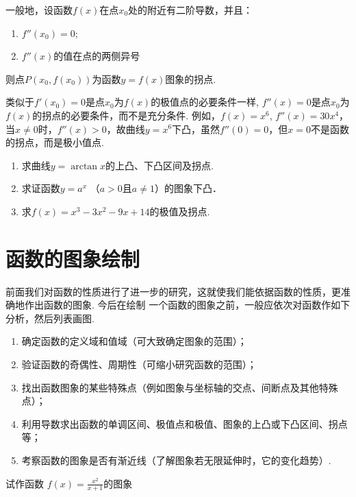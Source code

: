 一般地，设函数$f(x)$在点$x_0$处的附近有二阶导数，并且：
\begin{enumerate}[(1)]
\item $f''(x_0)=0$;
\item $f''(x)$的值在点的两侧异号
\end{enumerate}
则点$P(x_0,f(x_0))$为函数$y=f(x)$图象的拐点.

类似于$f'(x_0)=0$是点$x_0$为$f(x)$的极值点的必要条件一样, $f''(x)=0$是点$x_0$为$f(x)$的拐点的必要条件，而不是充分条件. 例如，$f(x)=x^6$, $f''(x)=30x^4$，当$x\ne 0$时，$f''(x)>0$，故曲线$y=x^6$下凸，虽然$f''(0)=0$，但$x=0$不是函数的拐点，而是极小值点.

\begin{ex}
\begin{enumerate}
    \item 求曲线$y=\arctan x$的上凸、下凸区间及拐点.
    \item 求证函数$y=a^x$ （$a>0$且$a\ne 1$）的图象下凸．
    \item 求$f(x)=x^3-3x^2-9x+14$的极值及拐点.
\end{enumerate}
\end{ex}

\section{函数的图象绘制}
前面我们对函数的性质进行了进一步的研究，这就使我们能依据函数的性质，更准确地作出函数的图象. 今后在绘制
一个函数的图象之前，一般应依次对函数作如下分析，然后列表画图.
\begin{enumerate}
\item 确定函数的定义域和值域（可大致确定图象的范围）；
\item 验证函数的奇偶性、周期性（可缩小研究函数的范围）；
\item 找出函数图象的某些特殊点（例如图象与坐标轴的交点、间断点及其他特殊点）；
\item 利用导数求出函数的单调区间、极值点和极值、图象的上凸或下凸区间、拐点等；
\item 考察函数的图象是否有渐近线（了解图象若无限延伸时，它的变化趋势）.
\end{enumerate}





\begin{example}
    试作函数 $f(x)=\frac{x^{2}}{x+1}$的图象
\end{example}

